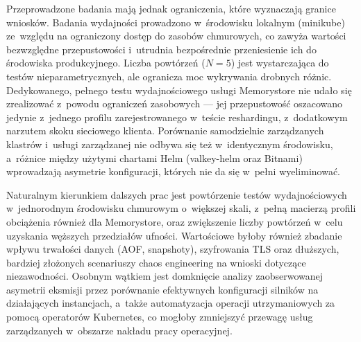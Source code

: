 Przeprowadzone badania mają jednak ograniczenia, które wyznaczają granice wniosków. Badania wydajności prowadzono w~środowisku lokalnym (minikube) ze~względu na ograniczony dostęp do zasobów chmurowych, co zawyża wartości bezwzględne przepustowości i~utrudnia bezpośrednie przeniesienie ich do środowiska produkcyjnego. Liczba powtórzeń ($N=5$) jest wystarczająca do testów nieparametrycznych, ale ogranicza moc wykrywania drobnych różnic. Dedykowanego, pełnego testu wydajnościowego usługi Memorystore nie udało się zrealizować z~powodu ograniczeń zasobowych --- jej przepustowość oszacowano jedynie z~jednego profilu zarejestrowanego w~teście reshardingu, z~dodatkowym narzutem skoku sieciowego klienta. Porównanie samodzielnie zarządzanych klastrów i~usługi zarządzanej nie odbywa się też w~identycznym środowisku, a~różnice między użytymi chartami Helm (valkey-helm oraz Bitnami) wprowadzają asymetrie konfiguracji, których nie da się w~pełni wyeliminować.

Naturalnym kierunkiem dalszych prac jest powtórzenie testów wydajnościowych w~jednorodnym środowisku chmurowym o~większej skali, z~pełną macierzą profili obciążenia również dla Memorystore, oraz zwiększenie liczby powtórzeń w~celu uzyskania węższych przedziałów ufności. Wartościowe byłoby również zbadanie wpływu trwałości danych (AOF, snapshoty), szyfrowania TLS oraz dłuższych, bardziej złożonych scenariuszy chaos engineering na wnioski dotyczące niezawodności. Osobnym wątkiem jest domknięcie analizy zaobserwowanej asymetrii eksmisji przez porównanie efektywnych konfiguracji silników na działających instancjach, a~także automatyzacja operacji utrzymaniowych za pomocą operatorów Kubernetes, co mogłoby zmniejszyć przewagę usług zarządzanych w~obszarze nakładu pracy operacyjnej.
